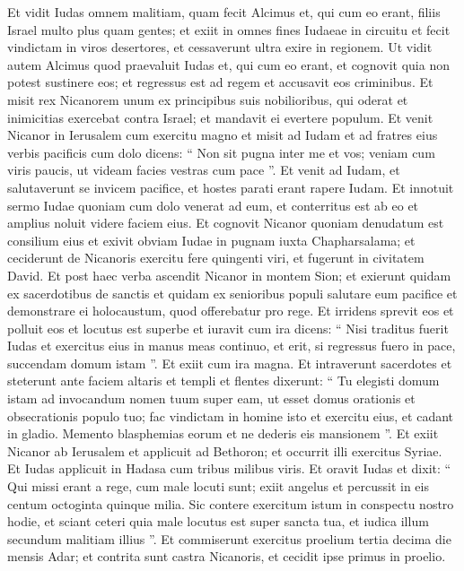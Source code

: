 \begin{biblechapter}
\begin{biblechapter}
\begin{biblechapter}
\begin{biblechapter}
\begin{biblechapter}
\begin{biblechapter}
\begin{biblechapter}
\verse Et vidit Iudas omnem malitiam, quam fecit Alcimus et, qui cum eo erant, filiis Israel multo plus quam gentes; 
\verse et exiit in omnes fines Iudaeae in circuitu et fecit vindictam in viros desertores, et cessaverunt ultra exire in regionem. 
\verse Ut vidit autem Alcimus quod praevaluit Iudas et, qui cum eo erant, et cognovit quia non potest sustinere eos; et regressus est ad regem et accusavit eos criminibus.
 \verse Et misit rex Nicanorem unum ex principibus suis nobilioribus, qui oderat et inimicitias exercebat contra Israel; et mandavit ei evertere populum. 
\verse Et venit Nicanor in Ierusalem cum exercitu magno et misit ad Iudam et ad fratres eius verbis pacificis cum dolo 
\verse dicens: “ Non sit pugna inter me et vos; veniam cum viris paucis, ut videam facies vestras cum pace ”. 
\verse Et venit ad Iudam, et salutaverunt se invicem pacifice, et hostes parati erant rapere Iudam. 
\verse Et innotuit sermo Iudae quoniam cum dolo venerat ad eum, et conterritus est ab eo et amplius noluit videre faciem eius. 
\verse Et cognovit Nicanor quoniam denudatum est consilium eius et exivit obviam Iudae in pugnam iuxta Chapharsalama; 
\verse et ceciderunt de Nicanoris exercitu fere quingenti viri, et fugerunt in civitatem David. 
\verse Et post haec verba ascendit Nicanor in montem Sion; et exierunt quidam ex sacerdotibus de sanctis et quidam ex senioribus populi salutare eum pacifice et demonstrare ei holocaustum, quod offerebatur pro rege. 
\verse Et irridens sprevit eos et polluit eos et locutus est superbe 
\verse et iuravit cum ira dicens: “ Nisi traditus fuerit Iudas et exercitus eius in manus meas continuo, et erit, si regressus fuero in pace, succendam domum istam ”. Et exiit cum ira magna. 
\verse Et intraverunt sacerdotes et steterunt ante faciem altaris et templi et flentes dixerunt: 
 \verse “ Tu elegisti domum istam ad invocandum nomen tuum super eam, ut esset domus orationis et obsecrationis populo tuo; 
\verse fac vindictam in homine isto et exercitu eius, et cadant in gladio. Memento blasphemias eorum et ne dederis eis mansionem ”.
 \verse Et exiit Nicanor ab Ierusalem et applicuit ad Bethoron; et occurrit illi exercitus Syriae. 
\verse Et Iudas applicuit in Hadasa cum tribus milibus viris. Et oravit Iudas et dixit: 
\verse “ Qui missi erant a rege, cum male locuti sunt; exiit angelus et percussit in eis centum octoginta quinque milia. 
\verse Sic contere exercitum istum in conspectu nostro hodie, et sciant ceteri quia male locutus est super sancta tua, et iudica illum secundum malitiam illius ”. 
\verse Et commiserunt exercitus proelium tertia decima die mensis Adar; et contrita sunt castra Nicanoris, et cecidit ipse primus in proelio. 

\end{biblechapter}
\end{biblechapter}
\end{biblechapter}
\end{biblechapter}
\end{biblechapter}
\end{biblechapter}
\end{biblechapter}
